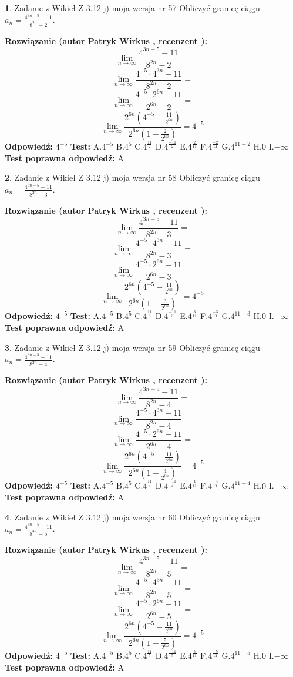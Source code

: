 \documentclass[12pt, a4paper]{article}
\theoremstyle{definition} %
\newtheorem{zad}{}
\newcommand{\zadStart}[1]{\begin{zad}#1\newline}
\newcommand{\zadStop}{\end{zad}}
\newcommand{\rozwStart}[2]{\noindent \textbf{Rozwiązanie (autor #1 , recenzent #2): }\newline}
\newcommand{\rozwStop}{\newline}
\newcommand{\odpStart}{\noindent \textbf{Odpowiedź:}\newline}
\newcommand{\odpStop}{\newline}
\newcommand{\testStart}{\noindent \textbf{Test:}\newline}
\newcommand{\testStop}{\newline}
\newcommand{\kluczStart}{\noindent \textbf{Test poprawna odpowiedź:}\newline}
\newcommand{\kluczStop}{\newline}
\begin{document}
\zadStart{Zadanie z Wikieł Z 3.12 j) moja wersja nr 57}
Obliczyć granicę ciągu $a_{n}=\frac{4^{3n-5}-11}{8^{2n}-2}$.
\zadStop
\rozwStart{Patryk Wirkus}{}
$$\lim\limits_{n\to\infty}\frac{4^{3n-5}-11}{8^{2n}-2}=$$
$$\lim\limits_{n\to\infty}\frac{4^{-5} \cdot 4^{3n}-11}{8^{2n}-2}=$$
$$\lim\limits_{n\to\infty}\frac{4^{-5} \cdot 2^{6n}-11}{2^{6n}-2}=$$
$$\lim\limits_{n\to\infty}\frac{2^{6n}(4^{-5} - \frac{11}{2^{6n}})}{2^{6n}(1-\frac{2}{2^{6n}})}= 4^{-5}$$
\rozwStop
\odpStart
$4^{-5}$
\odpStop
\testStart
A.$4^{-5}$
B.$4^{5}$
C.$4^{\frac{11}{2}}$
D.$4^{\frac{-11}{2}}$
E.$4^{\frac{2}{11}}$
F.$4^{\frac{-2}{11}}$
G.$4^{11-2}$
H.$0$
I.$-\infty$
\testStop
\kluczStart
A
\kluczStop



\zadStart{Zadanie z Wikieł Z 3.12 j) moja wersja nr 58}
Obliczyć granicę ciągu $a_{n}=\frac{4^{3n-5}-11}{8^{2n}-3}$.
\zadStop
\rozwStart{Patryk Wirkus}{}
$$\lim\limits_{n\to\infty}\frac{4^{3n-5}-11}{8^{2n}-3}=$$
$$\lim\limits_{n\to\infty}\frac{4^{-5} \cdot 4^{3n}-11}{8^{2n}-3}=$$
$$\lim\limits_{n\to\infty}\frac{4^{-5} \cdot 2^{6n}-11}{2^{6n}-3}=$$
$$\lim\limits_{n\to\infty}\frac{2^{6n}(4^{-5} - \frac{11}{2^{6n}})}{2^{6n}(1-\frac{3}{2^{6n}})}= 4^{-5}$$
\rozwStop
\odpStart
$4^{-5}$
\odpStop
\testStart
A.$4^{-5}$
B.$4^{5}$
C.$4^{\frac{11}{3}}$
D.$4^{\frac{-11}{3}}$
E.$4^{\frac{3}{11}}$
F.$4^{\frac{-3}{11}}$
G.$4^{11-3}$
H.$0$
I.$-\infty$
\testStop
\kluczStart
A
\kluczStop



\zadStart{Zadanie z Wikieł Z 3.12 j) moja wersja nr 59}
Obliczyć granicę ciągu $a_{n}=\frac{4^{3n-5}-11}{8^{2n}-4}$.
\zadStop
\rozwStart{Patryk Wirkus}{}
$$\lim\limits_{n\to\infty}\frac{4^{3n-5}-11}{8^{2n}-4}=$$
$$\lim\limits_{n\to\infty}\frac{4^{-5} \cdot 4^{3n}-11}{8^{2n}-4}=$$
$$\lim\limits_{n\to\infty}\frac{4^{-5} \cdot 2^{6n}-11}{2^{6n}-4}=$$
$$\lim\limits_{n\to\infty}\frac{2^{6n}(4^{-5} - \frac{11}{2^{6n}})}{2^{6n}(1-\frac{4}{2^{6n}})}= 4^{-5}$$
\rozwStop
\odpStart
$4^{-5}$
\odpStop
\testStart
A.$4^{-5}$
B.$4^{5}$
C.$4^{\frac{11}{4}}$
D.$4^{\frac{-11}{4}}$
E.$4^{\frac{4}{11}}$
F.$4^{\frac{-4}{11}}$
G.$4^{11-4}$
H.$0$
I.$-\infty$
\testStop
\kluczStart
A
\kluczStop



\zadStart{Zadanie z Wikieł Z 3.12 j) moja wersja nr 60}
Obliczyć granicę ciągu $a_{n}=\frac{4^{3n-5}-11}{8^{2n}-5}$.
\zadStop
\rozwStart{Patryk Wirkus}{}
$$\lim\limits_{n\to\infty}\frac{4^{3n-5}-11}{8^{2n}-5}=$$
$$\lim\limits_{n\to\infty}\frac{4^{-5} \cdot 4^{3n}-11}{8^{2n}-5}=$$
$$\lim\limits_{n\to\infty}\frac{4^{-5} \cdot 2^{6n}-11}{2^{6n}-5}=$$
$$\lim\limits_{n\to\infty}\frac{2^{6n}(4^{-5} - \frac{11}{2^{6n}})}{2^{6n}(1-\frac{5}{2^{6n}})}= 4^{-5}$$
\rozwStop
\odpStart
$4^{-5}$
\odpStop
\testStart
A.$4^{-5}$
B.$4^{5}$
C.$4^{\frac{11}{5}}$
D.$4^{\frac{-11}{5}}$
E.$4^{\frac{5}{11}}$
F.$4^{\frac{-5}{11}}$
G.$4^{11-5}$
H.$0$
I.$-\infty$
\testStop
\kluczStart
A
\kluczStop
\end{document}
